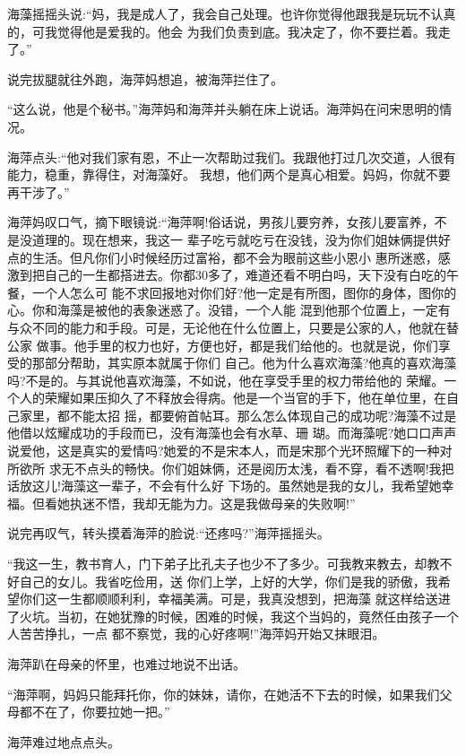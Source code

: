 \documentclass[11pt,a4paper,onecolumn]{article}
\begin{document}
海藻摇摇头说:``妈，我是成人了，我会自己处理。也许你觉得他跟我是玩玩不认真的，可我觉得他是爱我的。他会
为我们负责到底。我决定了，你不要拦着。我走了。''

说完拔腿就往外跑，海萍妈想追，被海萍拦住了。

``这么说，他是个秘书。''海萍妈和海萍并头躺在床上说话。海萍妈在问宋思明的情况。

海萍点头:``他对我们家有恩，不止一次帮助过我们。我跟他打过几次交道，人很有能力，稳重，靠得住，对海藻好。
我想，他们两个是真心相爱。妈妈，你就不要再干涉了。''

海萍妈叹口气，摘下眼镜说:``海萍啊!俗话说，男孩儿要穷养，女孩儿要富养，不是没道理的。现在想来，我这一
辈子吃亏就吃亏在没钱，没为你们姐妹俩提供好点的生活。但凡你们小时候经历过富裕，都不会为眼前这些小恩小
惠所迷惑，感激到把自己的一生都搭进去。你都30多了，难道还看不明白吗，天下没有白吃的午餐，一个人怎么可
能不求回报地对你们好?他一定是有所图，图你的身体，图你的心。你和海藻是被他的表象迷惑了。没错，一个人能
混到他那个位置上，一定有与众不同的能力和手段。可是，无论他在什么位置上，只要是公家的人，他就在替公家
做事。他手里的权力也好，方便也好，都是我们给他的。也就是说，你们享受的那部分帮助，其实原本就属于你们
自己。他为什么喜欢海藻?他真的喜欢海藻吗?不是的。与其说他喜欢海藻，不如说，他在享受手里的权力带给他的
荣耀。一个人的荣耀如果压抑久了不释放会得病。他是一个当官的手下，他在单位里，在自己家里，都不能太招
摇，都要俯首帖耳。那么怎么体现自己的成功呢?海藻不过是他借以炫耀成功的手段而已，没有海藻也会有水草、珊
瑚。而海藻呢?她口口声声说爱他，这是真实的爱情吗?她爱的不是宋本人，而是宋那个光环照耀下的一种对所欲所
求无不点头的畅快。你们姐妹俩，还是阅历太浅，看不穿，看不透啊!我把话放这儿!海藻这一辈子，不会有什么好
下场的。虽然她是我的女儿，我希望她幸福。但看她执迷不悟，我却无能为力。这是我做母亲的失败啊!''

说完再叹气，转头摸着海萍的脸说:``还疼吗?''海萍摇摇头。

``我这一生，教书育人，门下弟子比孔夫子也少不了多少。可我教来教去，却教不好自己的女儿。我省吃俭用，送
你们上学，上好的大学，你们是我的骄傲，我希望你们这一生都顺顺利利，幸福美满。可是，我真没想到，把海藻
就这样给送进了火坑。当初，在她犹豫的时候，困难的时候，我这个当妈的，竟然任由孩子一个人苦苦挣扎，一点
都不察觉，我的心好疼啊!''海萍妈开始又抹眼泪。

海萍趴在母亲的怀里，也难过地说不出话。

``海萍啊，妈妈只能拜托你，你的妹妹，请你，在她活不下去的时候，如果我们父母都不在了，你要拉她一把。''

海萍难过地点点头。
\end{document}
